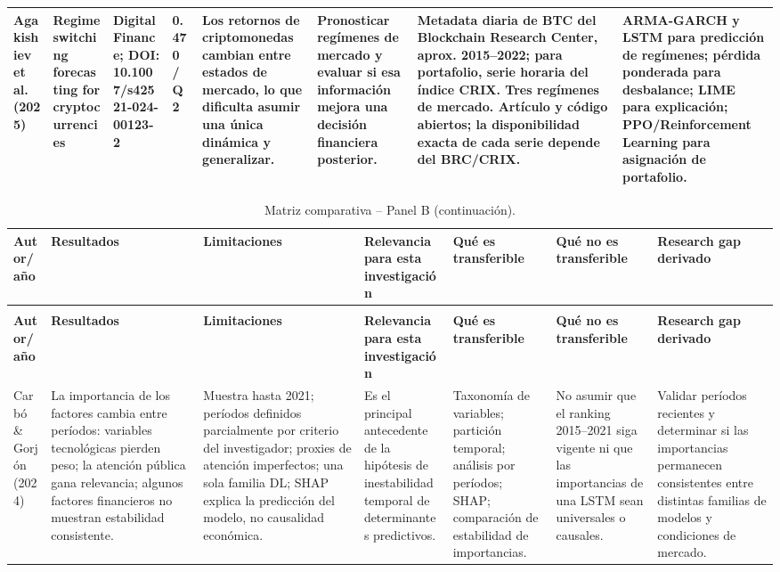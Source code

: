 \documentclass[11pt,letterpaper]{article}
\begin{document}
{\begin{landscape}
\begin{longtable}{p{1.55cm} p{2.8cm} p{2.9cm} p{1.25cm} p{2.8cm} p{2.8cm} p{4.0cm} p{3.6cm}}
Agakishiev et al. (2025) &
Regime switching forecasting for cryptocurrencies &
Digital Finance; DOI: 10.1007/s42521-024-00123-2 &
0.470 / Q2 &
Los retornos de criptomonedas cambian entre estados de mercado, lo que dificulta asumir una única dinámica y generalizar. &
Pronosticar regímenes de mercado y evaluar si esa información mejora una decisión financiera posterior. &
Metadata diaria de BTC del Blockchain Research Center, aprox. 2015--2022; para portafolio, serie horaria del índice CRIX. Tres regímenes de mercado. Artículo y código abiertos; la disponibilidad exacta de cada serie depende del BRC/CRIX. &
ARMA-GARCH y LSTM para predicción de regímenes; pérdida ponderada para desbalance; LIME para explicación; PPO/Reinforcement Learning para asignación de portafolio. \\
\bottomrule
\end{longtable}
\end{landscape}

\begin{landscape}
\thispagestyle{plain}
\scriptsize
\setlength{\tabcolsep}{3.2pt}
\renewcommand{\arraystretch}{1.28}
\begin{longtable}{p{1.55cm} p{3.3cm} p{4.1cm} p{3.25cm} p{3.0cm} p{3.0cm} p{3.9cm}}
\caption{Matriz comparativa -- Panel B: resultados, limitaciones, relevancia, transferibilidad y brechas.}\\
\toprule
\textbf{Autor/año} & \textbf{Resultados} & \textbf{Limitaciones} & \textbf{Relevancia para esta investigación} & \textbf{Qué es transferible} & \textbf{Qué no es transferible} & \textbf{Research gap derivado} \\
\midrule
\endfirsthead
\caption[]{Matriz comparativa -- Panel B (continuación).}\\
\toprule
\textbf{Autor/año} & \textbf{Resultados} & \textbf{Limitaciones} & \textbf{Relevancia para esta investigación} & \textbf{Qué es transferible} & \textbf{Qué no es transferible} & \textbf{Research gap derivado} \\
\midrule
\endhead

Carbó \& Gorjón (2024) &
La importancia de los factores cambia entre períodos: variables tecnológicas pierden peso; la atención pública gana relevancia; algunos factores financieros no muestran estabilidad consistente. &
Muestra hasta 2021; períodos definidos parcialmente por criterio del investigador; proxies de atención imperfectos; una sola familia DL; SHAP explica la predicción del modelo, no causalidad económica. &
Es el principal antecedente de la hipótesis de inestabilidad temporal de determinantes predictivos. &
Taxonomía de variables; partición temporal; análisis por períodos; SHAP; comparación de estabilidad de importancias. &
No asumir que el ranking 2015--2021 siga vigente ni que las importancias de una LSTM sean universales o causales. &
Validar períodos recientes y determinar si las importancias permanecen consistentes entre distintas familias de modelos y condiciones de mercado. \\
\midrule


\end{longtable}
\end{landscape}}
\end{document}
